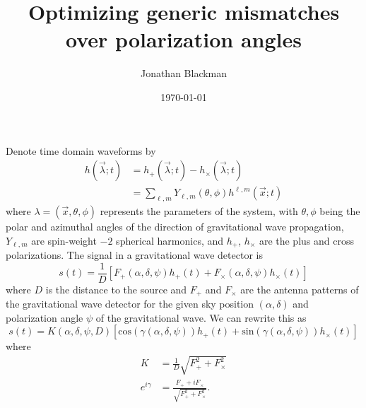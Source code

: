\documentclass{article}
\begin{document}
\title{
Optimizing generic mismatches over polarization angles
}

\author{Jonathan Blackman} 

\date{\today}

\maketitle

Denote time domain waveforms by
\begin{align}
h(\vec{\lambda}; t) &= h_+(\vec{\lambda}; t) - h_\times(\vec{\lambda}; t) \\
                    &= \sum_{\ell, m} Y_{\ell, m}(\theta, \phi)
                        h^{\ell, m}(\vec{x}; t)
\end{align}
where $\lambda = (\vec{x}, \theta, \phi)$ represents the parameters of the
system, with $\theta, \phi$ being the polar and azimuthal angles of the
direction of gravitational wave propagation, $Y_{\ell, m}$ are spin-weight
$-2$ spherical harmonics, and $h_+$, $h_\times$ are the plus and cross
polarizations.
The signal in a gravitational wave detector is
\begin{equation}
s(t) = \frac{1}{D}\left[F_+(\alpha, \delta, \psi) h_+(t) +
                        F_\times(\alpha, \delta, \psi) h_\times(t)\right]
\end{equation}
where $D$ is the distance to the source and
$F_+$ and $F_\times$ are the antenna patterns of the gravitational
wave detector for the given sky position $(\alpha, \delta)$
and polarization angle $\psi$ of the
gravitational wave.
We can rewrite this as
\begin{equation}
s(t) = K(\alpha, \delta, \psi, D) \left[
        \mathrm{cos}(\gamma(\alpha, \delta, \psi)) h_+(t) +
        \mathrm{sin}(\gamma(\alpha, \delta, \psi)) h_\times(t) \right]
\end{equation}
where
\begin{align}
K &= \frac{1}{D}\sqrt{F_+^2 + F_\times^2} \\
e^{i\gamma} &= \frac{F_+ + iF_\times}{\sqrt{F_+^2 + F_\times^2}}.
\end{align}
\end{document}
